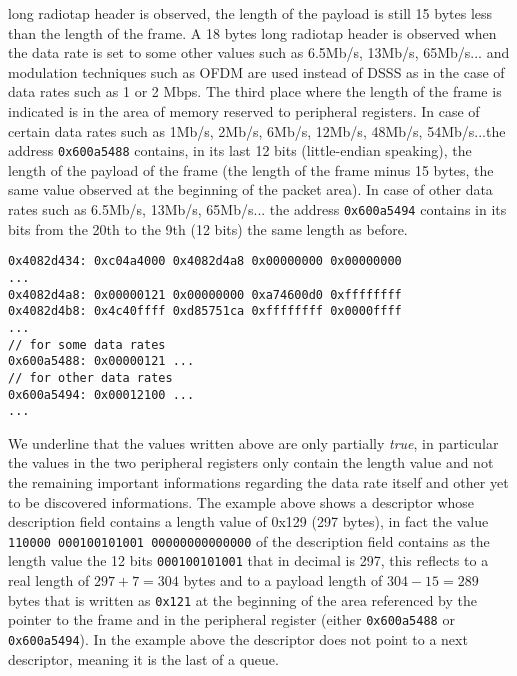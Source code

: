long radiotap header is observed, the length of the payload is still 15 bytes less than the length of the frame.
A 18 bytes long radiotap header is observed when the data rate is set to some other values such as 6.5Mb/s, 13Mb/s, 65Mb/s...
and modulation techniques such as OFDM are used instead of DSSS as in the case of data rates such as 1 or 2 Mbps. 
The third place where the length of the frame is indicated is in the area of memory reserved to
peripheral registers. 
In case of certain data rates 
such as 1Mb/s, 2Mb/s, 6Mb/s, 12Mb/s, 48Mb/s, 54Mb/s...the address \texttt{0x600a5488} contains, in its last 12 bits (little-endian speaking),
the length of the payload of the frame (the length of the frame minus 15 bytes, the same value observed
at the beginning of the packet area).
In case of other data rates such as 6.5Mb/s, 13Mb/s, 65Mb/s... the address 
\texttt{0x600a5494} contains in its bits from the 20th to the 9th (12 bits) the same length as before.

\newsavebox{\memdescriptor}
\begin{lrbox}{\memdescriptor}
\begin{lstlisting}
0x4082d434: 0xc04a4000 0x4082d4a8 0x00000000 0x00000000
...
0x4082d4a8: 0x00000121 0x00000000 0xa74600d0 0xffffffff
0x4082d4b8: 0x4c40ffff 0xd85751ca 0xffffffff 0x0000ffff
...
// for some data rates
0x600a5488: 0x00000121 ...
// for other data rates
0x600a5494: 0x00012100 ...
...
\end{lstlisting}
\end{lrbox}
\usebox{\memdescriptor}
We underline that the values written above are only partially \textit{true},
in particular the values in the two peripheral registers only contain the length value
and not the remaining important informations regarding the data rate itself and 
other yet to be discovered informations.  
The example above shows a descriptor whose description field contains a length value
of 0x129 (297 bytes), in fact the value 
\texttt{110000 000100101001 00000000000000} of the description field contains
as the length value the 12 bits \texttt{000100101001} that in decimal is 297,
this reflects to a real length of $297+7=304$ bytes and to a payload length of $304-15=289$ bytes
that is written as \texttt{0x121} at the beginning of the area referenced by the pointer to the frame and 
in the peripheral register (either \texttt{0x600a5488} or \texttt{0x600a5494}).
In the example above the descriptor does not point to a next descriptor, meaning it is the last
of a queue.
